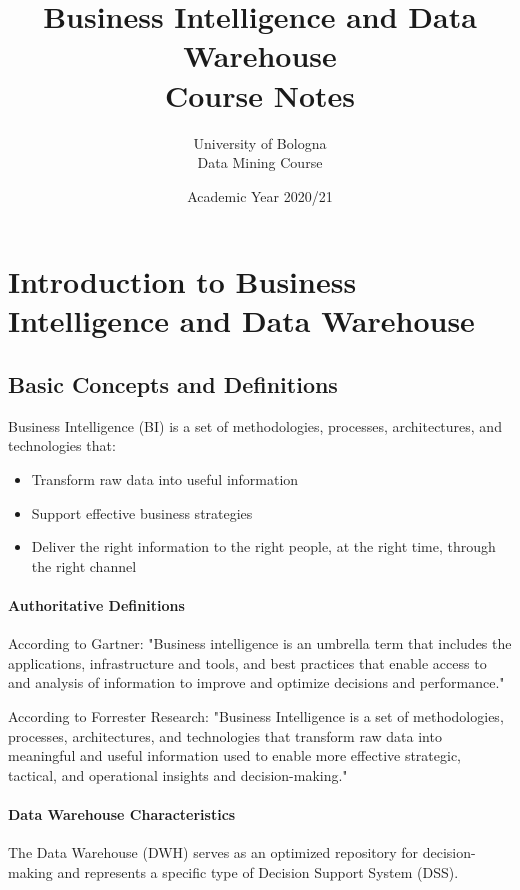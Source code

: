 \documentclass[a4paper,11pt]{article}
\title{\textbf{Business Intelligence and Data Warehouse}\\\large Course Notes}
\author{University of Bologna\\Data Mining Course}
\date{Academic Year 2020/21}
\newcommand{\definition}[1]{
  \begin{tcolorbox}[colback=blue!5,colframe=blue!40!black,title=Definition]
    #1
  \end{tcolorbox}
}
\begin{document}
\maketitle
\tableofcontents
\newpage

\section{Introduction to Business Intelligence and Data Warehouse}

\subsection{Basic Concepts and Definitions}
\definition{
Business Intelligence (BI) is a set of methodologies, processes, architectures, and technologies that:
\begin{itemize}
    \item Transform raw data into useful information
    \item Support effective business strategies
    \item Deliver the right information to the right people, at the right time, through the right channel
\end{itemize}
}

\paragraph{Authoritative Definitions}
According to Gartner: "Business intelligence is an umbrella term that includes the applications, infrastructure and tools, and best practices that enable access to and analysis of information to improve and optimize decisions and performance."

According to Forrester Research: "Business Intelligence is a set of methodologies, processes, architectures, and technologies that transform raw data into meaningful and useful information used to enable more effective strategic, tactical, and operational insights and decision-making."

\paragraph{Data Warehouse Characteristics}
\definition{
The Data Warehouse (DWH) serves as an optimized repository for decision-making and represents a specific type of Decision Support System (DSS).
}
\end{document}
